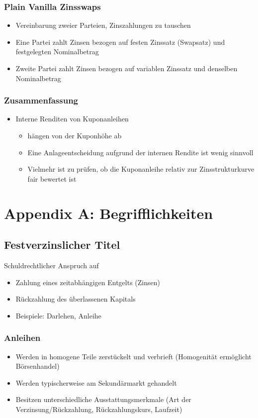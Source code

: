 \subsubsection{Plain Vanilla Zinsswaps}
\begin{itemize}
	\item Vereinbarung zweier Parteien, Zinszahlungen zu tauschen
	\item Eine Partei zahlt Zinsen bezogen auf festen Zinssatz (Swapsatz) und festgelegten Nominalbetrag
	\item Zweite Partei zahlt Zinsen bezogen auf variablen Zinssatz und denselben Nominalbetrag
\end{itemize}

\subsubsection{Zusammenfassung}
\begin{itemize}
	\item Interne Renditen von Kuponanleihen
	\begin{itemize}
		\item hängen von der Kuponhöhe ab
		\item Eine Anlageentscheidung aufgrund der internen Rendite ist wenig sinnvoll
		\item Vielmehr ist zu prüfen, ob die Kuponanleihe relativ zur Zinsstrukturkurve fair bewertet ist
	\end{itemize}
\end{itemize}



\section{Appendix A: Begrifflichkeiten}

\subsection{Festverzinslicher Titel}
Schuldrechtlicher Anspruch auf
\begin{itemize}
	\item Zahlung eines zeitabhängigen Entgelts (Zinsen)
	\item Rückzahlung des überlassenen Kapitals
	\item Beispiele: Darlehen, Anleihe
\end{itemize}

\subsubsection{Anleihen}
\begin{itemize}
	\item Werden in homogene Teile zerstückelt und verbrieft (Homogenität ermöglicht Börsenhandel)
	\item Werden typischerweise am Sekundärmarkt gehandelt
	\item Besitzen unterschiedliche Ausstattungsmerkmale (Art der Verzinsung/Rückzahlung, Rückzahlungskurs, Laufzeit)
\end{itemize}

